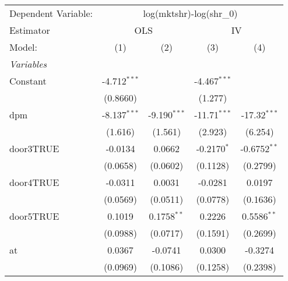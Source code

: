 
\begingroup
\centering
\begin{tabular}{lcccc}
   \tabularnewline \midrule \midrule
   Dependent Variable: & \multicolumn{4}{c}{log(mktshr)-log(shr\_0)}\\
   Estimator & \multicolumn{2}{c}{OLS} & \multicolumn{2}{c}{IV} \\ 
   Model:                                       & (1)             & (2)                    & (3)                    & (4)\\  
   \midrule
   \emph{Variables}\\
   Constant                                     & -4.712$^{***}$  &                        & -4.467$^{***}$         &   \\   
                                                & (0.8660)        &                        & (1.277)                &   \\   
   dpm                                          & -8.137$^{***}$  & -9.190$^{***}$         & -11.71$^{***}$         & -17.32$^{***}$\\   
                                                & (1.616)         & (1.561)                & (2.923)                & (6.254)\\   
   door3TRUE                                    & -0.0134         & 0.0662                 & -0.2170$^{*}$          & -0.6752$^{**}$\\   
                                                & (0.0658)        & (0.0602)               & (0.1128)               & (0.2799)\\   
   door4TRUE                                    & -0.0311         & 0.0031                 & -0.0281                & 0.0197\\   
                                                & (0.0569)        & (0.0511)               & (0.0778)               & (0.1636)\\   
   door5TRUE                                    & 0.1019          & 0.1758$^{**}$          & 0.2226                 & 0.5586$^{**}$\\   
                                                & (0.0988)        & (0.0717)               & (0.1591)               & (0.2699)\\   
   at                                           & 0.0367          & -0.0741                & 0.0300                 & -0.3274\\   
                                                & (0.0969)        & (0.1086)               & (0.1258)               & (0.2398)\\   

\end{tabular}
